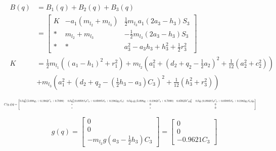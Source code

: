\begin{align*}
B(q) &= B_1(q)+B_2(q)+B_3(q)\\&= \begin{bmatrix}
K& -a_1( m_{l_2} + m_{l_3}) & \frac{1}{2}m_{l_3}a_1(2a_3-h_3)S_3\\
* & m_{l_2} + m_{l_3} & -\frac{1}{2}m_{l_3}(2a_3-h_3)S_3\\
* & * & a_3^2-a_3h_3+h_3^2+\frac{1}{2}r_3^2
\end{bmatrix}\\
K&=\frac{1}{2}m_{l_1}\left((a_1-h_1)^2+r_1^2\right)+m_{l_2}\left(a_1^2+\left(d_2+q_2-\frac{1}{2}a_2\right)^2+\frac{1}{12}\left(a_2^2+c_2^2\right)\right)\\&+m_{l_3}\left(a_1^2 + \left(d_2+q_2-\left(\frac{1}{2}h_3-a_3\right)C_3\right)^2+\frac{1}{12}(h_3^2+r_3^2)\right)
\end{align*}

\begin{equation*}
\resizebox{\textwidth}{!}{$
\hspace{-1cm}
C(q,\dot q)\dot q=\begin{bmatrix}
0.5\dot q_2^2(3.098q_2 + 0.1962C_3 + 0.7099) - 0.5\dot q_3^2(0.0958S_3C_3 + 0.05885S_3 + 0.1962q_2S_3) & 0.5\dot q_1\dot q_2(3.098q_2 + 0.1962C_3 + 0.7099) & 0.03923C_3\dot q_3^2 - 0.5\dot q_1(0.0948S_3C_3 + 0.05885S_3 + 0.1962q_2S_3)\dot q_3\\
*&0&0 \\
*& *& 0
\end{bmatrix}$}
\end{equation*}

\begin{equation*}
g(q)=\begin{bmatrix}
0\\0\\-m_{l_3}g\left(a_3-\frac{1}{2}h_3\right)C_3
\end{bmatrix}=\begin{bmatrix}
0\\0\\ -0.9621C_3
\end{bmatrix}
\end{equation*}